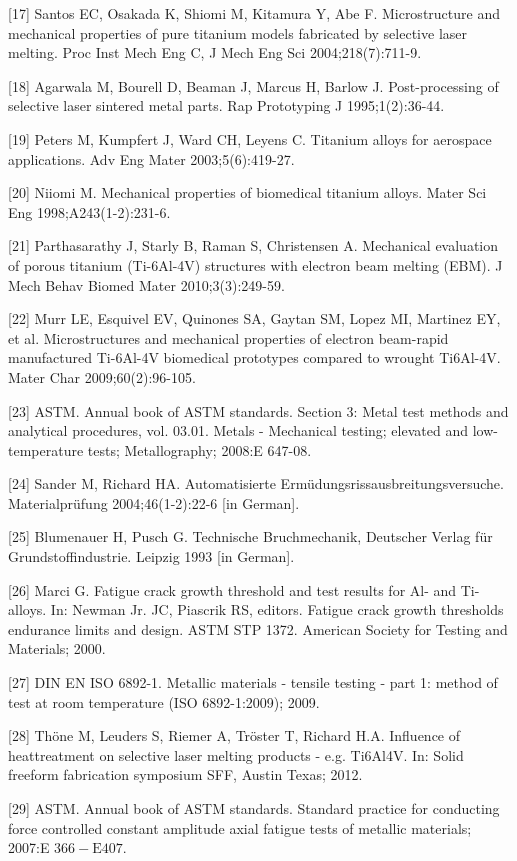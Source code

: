 \documentclass[10pt]{article}
\begin{document}
[17] Santos EC, Osakada K, Shiomi M, Kitamura Y, Abe F. Microstructure and mechanical properties of pure titanium models fabricated by selective laser melting. Proc Inst Mech Eng C, J Mech Eng Sci 2004;218(7):711-9.

[18] Agarwala M, Bourell D, Beaman J, Marcus H, Barlow J. Post-processing of selective laser sintered metal parts. Rap Prototyping J 1995;1(2):36-44.

[19] Peters M, Kumpfert J, Ward CH, Leyens C. Titanium alloys for aerospace applications. Adv Eng Mater 2003;5(6):419-27.

[20] Niiomi M. Mechanical properties of biomedical titanium alloys. Mater Sci Eng 1998;A243(1-2):231-6.

[21] Parthasarathy J, Starly B, Raman S, Christensen A. Mechanical evaluation of porous titanium (Ti-6Al-4V) structures with electron beam melting (EBM). J Mech Behav Biomed Mater 2010;3(3):249-59.

[22] Murr LE, Esquivel EV, Quinones SA, Gaytan SM, Lopez MI, Martinez EY, et al. Microstructures and mechanical properties of electron beam-rapid manufactured Ti-6Al-4V biomedical prototypes compared to wrought Ti6Al-4V. Mater Char 2009;60(2):96-105.

[23] ASTM. Annual book of ASTM standards. Section 3: Metal test methods and analytical procedures, vol. 03.01. Metals - Mechanical testing; elevated and low-temperature tests; Metallography; 2008:E 647-08.

[24] Sander M, Richard HA. Automatisierte Ermüdungsrissausbreitungsversuche. Materialprüfung 2004;46(1-2):22-6 [in German].

[25] Blumenauer H, Pusch G. Technische Bruchmechanik, Deutscher Verlag für Grundstoffindustrie. Leipzig 1993 [in German].

[26] Marci G. Fatigue crack growth threshold and test results for Al- and Ti-alloys. In: Newman Jr. JC, Piascrik RS, editors. Fatigue crack growth thresholds endurance limits and design. ASTM STP 1372. American Society for Testing and Materials; 2000.

[27] DIN EN ISO 6892-1. Metallic materials - tensile testing - part 1: method of test at room temperature (ISO 6892-1:2009); 2009.

[28] Thöne M, Leuders S, Riemer A, Tröster T, Richard H.A. Influence of heattreatment on selective laser melting products - e.g. Ti6Al4V. In: Solid freeform fabrication symposium SFF, Austin Texas; 2012.

[29] ASTM. Annual book of ASTM standards. Standard practice for conducting force controlled constant amplitude axial fatigue tests of metallic materials; 2007:E $366-\mathrm{E} 407$.
\end{document}
